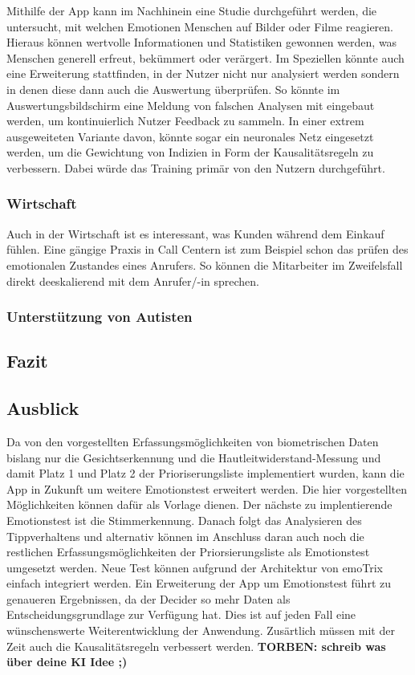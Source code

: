 Mithilfe der App kann im Nachhinein eine Studie durchgeführt werden, die untersucht, mit welchen Emotionen Menschen auf Bilder oder Filme reagieren. Hieraus können wertvolle Informationen und Statistiken gewonnen werden, was Menschen generell erfreut, bekümmert oder verärgert. \newline
Im Speziellen könnte auch eine Erweiterung stattfinden, in der Nutzer nicht nur analysiert werden sondern in denen diese dann auch die Auswertung überprüfen. So könnte im Auswertungsbildschirm eine Meldung von falschen Analysen mit eingebaut werden, um kontinuierlich Nutzer Feedback zu sammeln. In einer extrem ausgeweiteten Variante davon, könnte sogar ein neuronales Netz eingesetzt werden, um die Gewichtung von Indizien in Form der Kausalitätsregeln zu verbessern. Dabei würde das Training primär von den Nutzern durchgeführt. 
\subsubsection{Wirtschaft}
Auch in der Wirtschaft ist es interessant, was Kunden während dem Einkauf fühlen. Eine gängige Praxis in Call Centern ist zum Beispiel schon das prüfen des emotionalen Zustandes eines Anrufers. So können die Mitarbeiter im Zweifelsfall direkt deeskalierend mit dem Anrufer/-in sprechen.
\subsubsection{Unterstützung von Autisten}
\subsection{Fazit}

\subsection{Ausblick}
Da von den vorgestellten Erfassungsmöglichkeiten von biometrischen Daten bislang nur die Gesichtserkennung und die Hautleitwiderstand-Messung und damit Platz 1 und Platz 2 der Prioriserungsliste implementiert wurden, kann die App in Zukunft um weitere Emotionstest erweitert werden. Die hier vorgestellten Möglichkeiten können dafür als Vorlage dienen. Der nächste zu implentierende Emotionstest ist die Stimmerkennung. Danach folgt das Analysieren des Tippverhaltens und alternativ können im Anschluss daran auch noch die restlichen Erfassungsmöglichkeiten der Priorsierungsliste als Emotionstest umgesetzt werden. Neue Test können aufgrund der Architektur von emoTrix einfach integriert werden. \newline
Ein Erweiterung der App um Emotionstest führt zu genaueren Ergebnissen, da der Decider so mehr Daten als Entscheidungsgrundlage zur Verfügung hat. Dies ist auf jeden Fall eine wünschenswerte Weiterentwicklung der Anwendung.\newline
Zusärtlich müssen mit der Zeit auch die Kausalitätsregeln verbessert werden. \textbf{TORBEN: schreib was über deine KI Idee ;)} 
